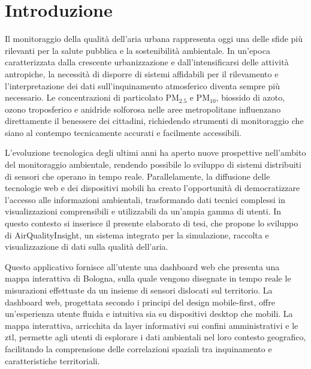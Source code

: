 \chapter*{Introduzione} %



Il monitoraggio della qualità dell'aria urbana rappresenta oggi una delle sfide più rilevanti per la salute
pubblica e la sostenibilità ambientale. In un'epoca caratterizzata dalla crescente urbanizzazione e dall'intensificarsi
delle attività antropiche, la necessità di disporre di sistemi affidabili per il rilevamento e l'interpretazione
dei dati sull'inquinamento atmosferico diventa sempre più necessario. Le concentrazioni di particolato
PM$_{2.5}$ e PM$_{10}$, biossido di azoto, ozono troposferico e anidride solforosa nelle aree metropolitane
influenzano direttamente il benessere dei cittadini, richiedendo strumenti di monitoraggio che siano al contempo
tecnicamente accurati e facilmente accessibili.

L'evoluzione tecnologica degli ultimi anni ha aperto nuove prospettive nell'ambito del monitoraggio ambientale,
rendendo possibile lo sviluppo di sistemi distribuiti di sensori che operano in tempo reale. Parallelamente,
la diffusione delle tecnologie web e dei dispositivi mobili ha creato l'opportunità di democratizzare l'accesso
alle informazioni ambientali, trasformando dati tecnici complessi in visualizzazioni comprensibili e utilizzabili
da un'ampia gamma di utenti. In questo contesto si inserisce il presente elaborato di tesi, che propone lo sviluppo
di AirQualityInsight, un sistema integrato per la simulazione, raccolta e visualizzazione di dati
sulla qualità dell'aria.

Questo applicativo fornisce all'utente una dashboard web che presenta una mappa interattiva di Bologna, sulla quale
vengono disegnate in tempo reale le misurazioni effettuate da un insieme di sensori dislocati sul territorio.
La dashboard web, progettata secondo i principi del design mobile-first, offre un'esperienza utente fluida e intuitiva
sia su dispositivi desktop che mobili. La mappa interattiva, arricchita da layer informativi
sui confini amministrativi e le \acrshort{ztl}, permette agli utenti di esplorare i dati ambientali nel loro contesto
geografico, facilitando la comprensione delle correlazioni spaziali tra inquinamento e caratteristiche territoriali.

